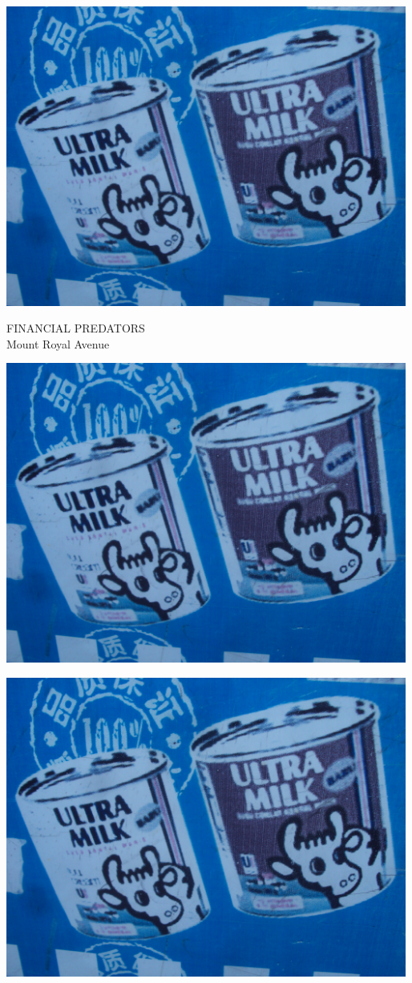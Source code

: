 \documentclass[10pt,letterpaper]{article}
\begin{document}
\vspace{0.25in}
\includegraphics[width=5.19in]{landscape.jpg}

FINANCIAL PREDATORS\\
Mount Royal Avenue\\
\pagebreak

\includegraphics[width=5.19in]{landscape.jpg}

\vspace{0.25in}
\includegraphics[width=5.19in]{landscape.jpg}
\end{document}
